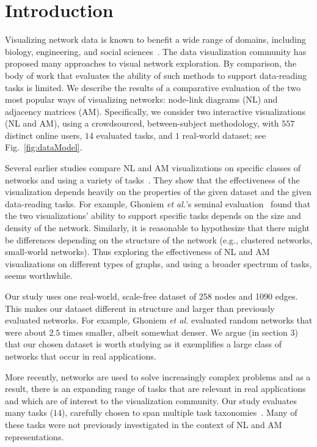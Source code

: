 \section{Introduction}

Visualizing network data is known to 
benefit a wide range of domains, including biology, engineering, and social sciences~\cite{von2011visual}. The data visualization community has proposed many approaches to visual network exploration. 
By comparison, the body of work that evaluates the ability of such methods to support data-reading tasks is limited. 
We describe the results of a comparative evaluation of the two most popular ways of visualizing networks: node-link diagrams (NL) and adjacency matrices (AM).   Specifically, we 
consider two interactive visualizations (NL and AM), using a crowdsourced, between-subject methodology, with $557$ distinct online users, $14$ evaluated tasks, and $1$ real-world dataset; see Fig.~\ref{fig:dataModel}.

Several earlier studies compare NL and AM visualizations on specific classes of networks and using a variety of tasks~\cite{ghoniem2004comparison,ghoniem2005readability,okoeecological,keller2006matrices}. They show that the effectiveness of the visualization depends heavily on the properties of the given dataset and the given data-reading tasks. For example, Ghoniem {\it et al.}'s seminal evaluation~\cite{ghoniem2004comparison} found that the two visualizations' ability to support specific tasks depends on the  size and density of the network. Similarly, it is reasonable to hypothesize that there might be differences depending on the   structure of the network (e.g., clustered networks, small-world networks). Thus exploring the effectiveness of NL and AM visualizations on different types of graphs, and using a broader spectrum of tasks, seems worthwhile.

Our study uses one real-world, scale-free dataset of 258 nodes and 1090 edges. This makes our dataset different in structure and larger than previously evaluated networks. For example, Ghoniem {\it et al.} evaluated random networks that were about $2.5$ times smaller, albeit somewhat denser. We argue (in section 3) that our chosen dataset is worth studying as it exemplifies a large class of networks that occur in real applications.

More recently, networks are used to solve increasingly complex problems and as a result, there is an expanding range of tasks that are relevant in real applications and which are of interest to the visualization community. Our study evaluates many tasks ($14$), carefully chosen to span multiple task taxonomies~\cite{lee2006task,amar2005low}. Many of these tasks were not previously investigated in the context of NL and AM representations.



